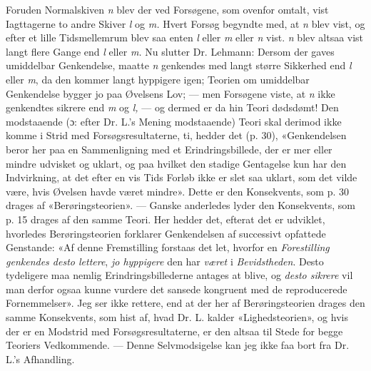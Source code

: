 \documentclass[12pt,a4paper,openany]{book}
\newcommand{\opage}[1]{\marginnote{\footnotesize\textit{[#1]}}}
\begin{document}
Foruden Normalskiven \textit{n} blev der ved Forsøgene, som ovenfor omtalt,
vist Iagttagerne to andre Skiver \textit{l} og \textit{m.} Hvert Forsøg
begyndte med, at \textit{n} blev vist, og efter et lille Tidsmellemrum blev saa
enten \textit{l} eller \textit{m} eller \textit{n} vist. \textit{n} blev altsaa
vist langt flere Gange end \textit{l} eller \textit{m.} Nu slutter Dr. Lehmann:
Dersom der gaves umiddelbar Genkendelse, maatte \textit{n} genkendes med langt
større Sikkerhed end \textit{l} eller \textit{m}, da den kommer langt hyppigere
igen; Teorien om umiddelbar Genkendelse bygger jo paa Øvelsens Lov; --- men
Forsøgene viste, at \textit{n} ikke genkendtes sikrere end \textit{m}
og\textit{ l,} --- og dermed er da hin Teori dødsdømt! Den modstaaende (ɔ:
efter Dr. L.'s Mening modstaaende) Teori skal derimod ikke komme i Strid med
Forsøgsresultaterne, ti, hedder det (p. 30), «Genkendelsen beror her paa en
Sammenligning med et Erindringsbillede, der er mer eller mindre udvisket og
uklart, og paa hvilket den stadige Gentagelse kun har den Indvirkning, at det
efter en vis Tids Forløb ikke er slet saa uklart, som det vilde være, hvis
Øvelsen havde været mindre». Dette er den Konsekvents, som p. 30 drages af
«Berøringsteorien». --- Ganske anderledes lyder den Konsekvents, som p. 15
drages af den samme Teori. Her hedder det, efterat det
\setcounter{footnote}{0}%
\opage{33}er udviklet, hvorledes Berøringsteorien forklarer Genkendelsen af
successivt opfattede Genstande: «Af denne Fremstilling forstaas det let,
hvorfor en \emph{Forestilling genkendes desto lettere}, \emph{jo hyppigere} den
har \emph{været} i \emph{Bevidstheden}. Desto tydeligere maa nemlig
Erindringsbillederne antages at blive, og \emph{desto sikrere} vil man derfor
ogsaa kunne vurdere det sansede kongruent med de reproducerede Fornemmelser».
Jeg ser ikke rettere, end at der her af Berøringsteorien drages den samme
Konsekvents, som hist af, hvad Dr. L. kalder «Lighedsteorien», og hvis der er
en Modstrid med Forsøgsresultaterne, er den altsaa til Stede for begge Teoriers
Vedkommende. --- Denne Selvmodsigelse kan jeg ikke faa bort fra Dr. L.'s Afhandling.
\end{document}
